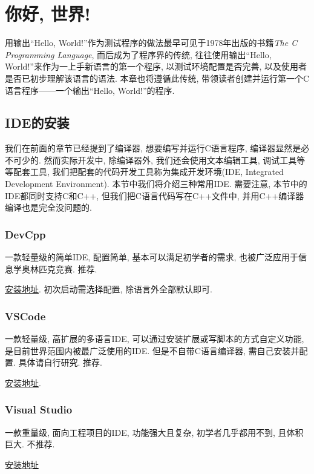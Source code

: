 \chapter{你好, 世界!} \label{你好, 世界!}
    用输出``Hello, World!''作为测试程序的做法最早可见于1978年出版的书籍\emph{The C Programming Language}, 而后成为了程序界的传统, 往往使用输出``Hello, World!''来作为一上手新语言的第一个程序, 以测试环境配置是否完善, 以及使用者是否已初步理解该语言的语法. 本章也将遵循此传统, 带领读者创建并运行第一个C语言程序——一个输出``Hello, World!''的程序.

    \section{IDE的安装}
        我们在前面的章节已经提到了编译器, 想要编写并运行C语言程序, 编译器显然是必不可少的. 然而实际开发中, 除编译器外, 我们还会使用文本编辑工具, 调试工具等等配套工具, 我们把配套的代码开发工具称为集成开发环境(IDE, Integrated Development Environment). 本节中我们将介绍三种常用IDE. 需要注意, 本节中的IDE都同时支持C和C++, 但我们把C语言代码写在C++文件中, 并用C++编译器编译也是完全没问题的.
        
        \subsection*{DevCpp}
            一款轻量级的简单IDE, 配置简单, 基本可以满足初学者的需求, 也被广泛应用于信息学奥林匹克竞赛. 推荐.

            \href{https://sourceforge.net/projects/orwelldevcpp/}{安装地址}. 初次启动需选择配置, 除语言外全部默认即可.

        \subsection*{VSCode}
            一款轻量级, 高扩展的多语言IDE, 可以通过安装扩展或写脚本的方式自定义功能, 是目前世界范围内被最广泛使用的IDE. 但是不自带C语言编译器, 需自己安装并配置. 具体请自行研究. 推荐.

            \href{https://code.visualstudio.com/}{安装地址}.

        \subsection*{Visual Studio}
            一款重量级, 面向工程项目的IDE, 功能强大且复杂, 初学者几乎都用不到, 且体积巨大. 不推荐.

            \href{https://visualstudio.microsoft.com/zh-hans/vs/}{安装地址}

